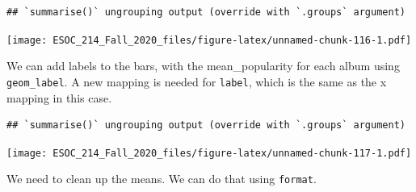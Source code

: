 \documentclass[
]{book}
\newenvironment{Shaded}{\begin{snugshade}}{\end{snugshade}}
\newcommand{\DataTypeTok}[1]{\textcolor[rgb]{0.13,0.29,0.53}{#1}}
\newcommand{\DecValTok}[1]{\textcolor[rgb]{0.00,0.00,0.81}{#1}}
\newcommand{\KeywordTok}[1]{\textcolor[rgb]{0.13,0.29,0.53}{\textbf{#1}}}
\newcommand{\NormalTok}[1]{#1}
\newcommand{\OperatorTok}[1]{\textcolor[rgb]{0.81,0.36,0.00}{\textbf{#1}}}
\newcommand{\StringTok}[1]{\textcolor[rgb]{0.31,0.60,0.02}{#1}}
\begin{document}
\begin{verbatim}
## `summarise()` ungrouping output (override with `.groups` argument)
\end{verbatim}

\texttt{[image: ESOC\_214\_Fall\_2020\_files/figure-latex/unnamed-chunk-116-1.pdf]}

We can add labels to the bars, with the mean\_popularity for each album using \texttt{geom\_label}. A new mapping is needed for \texttt{label}, which is the same as the x mapping in this case.

\begin{Shaded}
\end{Shaded}

\begin{verbatim}
## `summarise()` ungrouping output (override with `.groups` argument)
\end{verbatim}

\texttt{[image: ESOC\_214\_Fall\_2020\_files/figure-latex/unnamed-chunk-117-1.pdf]}

We need to clean up the means. We can do that using \texttt{format}.

\begin{Shaded}
\end{Shaded}
\end{document}

